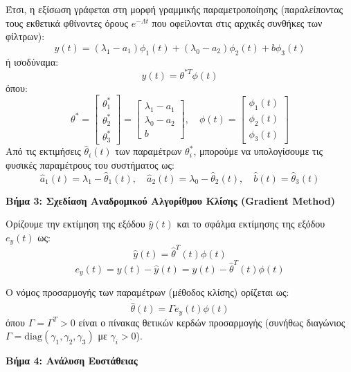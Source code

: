 \documentclass[a4paper,11pt]{article}
\begin{document}
\begin{answer}
Έτσι, η εξίσωση γράφεται στη μορφή γραμμικής παραμετροποίησης (παραλείποντας τους εκθετικά φθίνοντες όρους $e^{-\Lambda t}$ που οφείλονται στις αρχικές συνθήκες των φίλτρων):
\[ y(t) = (\lambda_1 - a_1) \phi_1(t) + (\lambda_0 - a_2) \phi_2(t) + b \phi_3(t) \]
ή ισοδύναμα:
\[ y(t) = \theta^{*T} \phi(t) \]
όπου:
\[ \theta^* = \begin{bmatrix} \theta_1^* \\ \theta_2^* \\ \theta_3^* \end{bmatrix} = \begin{bmatrix} \lambda_1 - a_1 \\ \lambda_0 - a_2 \\ b \end{bmatrix}, \quad \phi(t) = \begin{bmatrix} \phi_1(t) \\ \phi_2(t) \\ \phi_3(t) \end{bmatrix} \]
Από τις εκτιμήσεις $\hat{\theta}_i(t)$ των παραμέτρων $\theta_i^*$, μπορούμε να υπολογίσουμε τις φυσικές παραμέτρους του συστήματος ως:
\[ \hat{a}_1(t) = \lambda_1 - \hat{\theta}_1(t), \quad \hat{a}_2(t) = \lambda_0 - \hat{\theta}_2(t), \quad \hat{b}(t) = \hat{\theta}_3(t) \]

\textbf{Βήμα 3: Σχεδίαση Αναδρομικού Αλγορίθμου Κλίσης (Gradient Method)}

Ορίζουμε την εκτίμηση της εξόδου $\hat{y}(t)$ και το σφάλμα εκτίμησης της εξόδου $e_y(t)$ ως:
\[ \hat{y}(t) = \hat{\theta}^T(t) \phi(t) \]
\[ e_y(t) = y(t) - \hat{y}(t) = y(t) - \hat{\theta}^T(t) \phi(t) \]

Ο νόμος προσαρμογής των παραμέτρων (μέθοδος κλίσης) ορίζεται ως:
\[ \dot{\hat{\theta}}(t) = \Gamma e_y(t) \phi(t) \]
όπου $\Gamma = \Gamma^T > 0$ είναι ο πίνακας θετικών κερδών προσαρμογής (συνήθως διαγώνιος $\Gamma = \text{diag}(\gamma_1, \gamma_2, \gamma_3)$ με $\gamma_i > 0$).

\textbf{Βήμα 4: Ανάλυση Ευστάθειας}


\end{answer}
\end{document}
